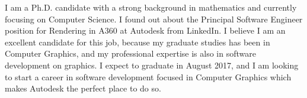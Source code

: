 \documentclass[10pt,stdletter,dateno,sigleft,letterpaper]{newlfm} %
\begin{document}
\begin{newlfm}



I am a Ph.D. candidate with a strong background in mathematics and currently focusing on Computer Science. I found out about the Principal Software Engineer position for Rendering in A360 at Autodesk from LinkedIn. I believe I am an excellent candidate for this job, because my graduate studies has been in Computer Graphics, and my professional expertise is also in software development on graphics. I expect to graduate in August 2017, and I am looking to start a career in software development focused in Computer Graphics which makes Autodesk the perfect place to do so.



\end{newlfm}
\end{document}
